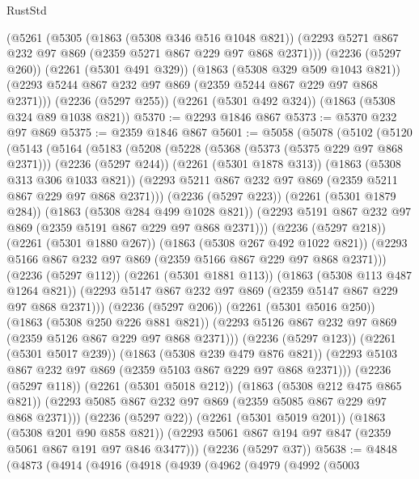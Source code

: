 \begin{lexlean}{RustStd}
\begin{coremodule}
    (@5261
      (@5305
        (@1863 (@5308 @346 @516 @1048 @821))
        (@2293 @5271 @867 @232 @97 @869 (@2359 @5271 @867 @229 @97 @868 @2371)))
      (@2236 (@5297 @260))
      (@2261 (@5301 @491 @329))
      (@1863 (@5308 @329 @509 @1043 @821))
      (@2293 @5244 @867 @232 @97 @869 (@2359 @5244 @867 @229 @97 @868 @2371)))
    (@2236 (@5297 @255))
    (@2261 (@5301 @492 @324))
    (@1863 (@5308 @324 @89 @1038 @821))
@5370 := @2293 @1846 @867
@5373 := @5370 @232 @97 @869
@5375 := @2359 @1846 @867
@5601 := @5058
    (@5078
      (@5102
        (@5120
          (@5143
            (@5164
              (@5183
                (@5208
                  (@5228
                    (@5368 (@5373 (@5375 @229 @97 @868 @2371)))
                    (@2236 (@5297 @244))
                    (@2261 (@5301 @1878 @313))
                    (@1863 (@5308 @313 @306 @1033 @821))
                    (@2293 @5211 @867 @232 @97 @869 (@2359 @5211 @867 @229 @97 @868 @2371)))
                  (@2236 (@5297 @223))
                  (@2261 (@5301 @1879 @284))
                  (@1863 (@5308 @284 @499 @1028 @821))
                  (@2293 @5191 @867 @232 @97 @869 (@2359 @5191 @867 @229 @97 @868 @2371)))
                (@2236 (@5297 @218))
                (@2261 (@5301 @1880 @267))
                (@1863 (@5308 @267 @492 @1022 @821))
                (@2293 @5166 @867 @232 @97 @869 (@2359 @5166 @867 @229 @97 @868 @2371)))
              (@2236 (@5297 @112))
              (@2261 (@5301 @1881 @113))
              (@1863 (@5308 @113 @487 @1264 @821))
              (@2293 @5147 @867 @232 @97 @869 (@2359 @5147 @867 @229 @97 @868 @2371)))
            (@2236 (@5297 @206))
            (@2261 (@5301 @5016 @250))
            (@1863 (@5308 @250 @226 @881 @821))
            (@2293 @5126 @867 @232 @97 @869 (@2359 @5126 @867 @229 @97 @868 @2371)))
          (@2236 (@5297 @123))
          (@2261 (@5301 @5017 @239))
          (@1863 (@5308 @239 @479 @876 @821))
          (@2293 @5103 @867 @232 @97 @869 (@2359 @5103 @867 @229 @97 @868 @2371)))
        (@2236 (@5297 @118))
        (@2261 (@5301 @5018 @212))
        (@1863 (@5308 @212 @475 @865 @821))
        (@2293 @5085 @867 @232 @97 @869 (@2359 @5085 @867 @229 @97 @868 @2371)))
      (@2236 (@5297 @22))
      (@2261 (@5301 @5019 @201))
      (@1863 (@5308 @201 @90 @858 @821))
      (@2293 @5061 @867 @194 @97 @847 (@2359 @5061 @867 @191 @97 @846 @3477)))
    (@2236 (@5297 @37))
@5638 := @4848
    (@4873
      (@4914
        (@4916
          (@4918
            (@4939
              (@4962
                (@4979
                  (@4992
                    (@5003

\end{coremodule}
\end{lexlean}
